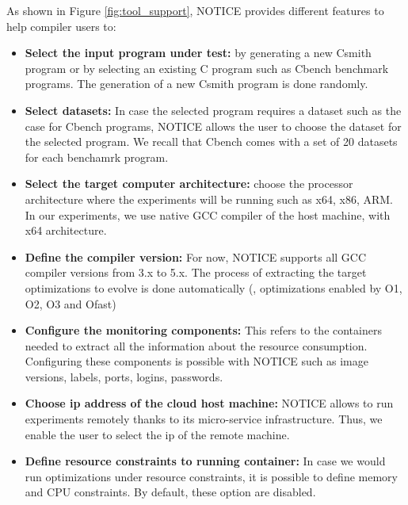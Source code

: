 As shown in Figure \ref{fig:tool_support}, NOTICE provides different features to help compiler users to:
\begin{itemize} 
	
	
	\item \textbf{Select the input program under test:} by generating a new Csmith program or by selecting an existing C program such as Cbench benchmark programs. The generation of a new Csmith program is done randomly.
	
	\item \textbf{Select datasets:} In case the selected program requires a dataset such as the case for Cbench programs, NOTICE allows the user to choose the dataset for the selected program. We recall that Cbench comes with a set of 20 datasets for each benchamrk program.
	
	\item \textbf{Select the target computer architecture:} choose the processor architecture where the experiments will be running such as x64, x86, ARM. In our experiments, we use native GCC compiler of the host machine, with x64 architecture.
	
	\item \textbf{Define the compiler version:} For now, NOTICE supports all GCC compiler versions from 3.x to 5.x. The process of extracting the target optimizations to evolve is done automatically (\ie, optimizations enabled by O1, O2, O3 and Ofast)
	
	\item \textbf{Configure the monitoring components:} This refers to the containers needed to extract all the information about the resource consumption. Configuring these components is possible with NOTICE such as image versions, labels, ports, logins, passwords.
	
	\item \textbf{Choose ip address of the cloud host machine:} NOTICE allows to run experiments remotely thanks to its micro-service infrastructure. Thus, we enable the user to select the ip of the remote machine.
	
	\item \textbf{Define resource constraints to running container:} In case we would run optimizations under resource constraints, it is possible to define memory and CPU constraints. By default, these option are disabled.
	

\end{itemize}
